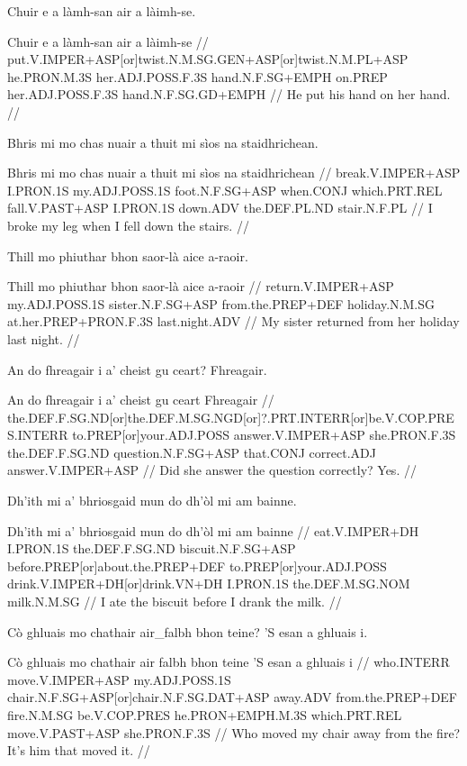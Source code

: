 \documentclass[a4paper,10pt]{article}
\begin{document}
\ex
\begingl
\glpre Chuir e a làmh-san air a làimh-se. 

\vspace{4mm}
\gla Chuir e a làmh-san air a làimh-se  //
\glb put.V.IMPER+ASP[or]twist.N.M.SG.GEN+ASP[or]twist.N.M.PL+ASP he.PRON.M.3S her.ADJ.POSS.F.3S hand.N.F.SG+EMPH on.PREP her.ADJ.POSS.F.3S hand.N.F.SG.GD+EMPH  //
\glft He put his hand on her hand. //
\endgl
\xe

\ex
\begingl
\glpre Bhris mi mo chas nuair a thuit mi sìos na staidhrichean. 

\vspace{4mm}
\gla Bhris mi mo chas nuair a thuit mi sìos na staidhrichean  //
\glb break.V.IMPER+ASP I.PRON.1S my.ADJ.POSS.1S foot.N.F.SG+ASP when.CONJ which.PRT.REL fall.V.PAST+ASP I.PRON.1S down.ADV the.DEF.PL.ND stair.N.F.PL  //
\glft I broke my leg when I fell down the stairs. //
\endgl
\xe

\ex
\begingl
\glpre Thill mo phiuthar bhon saor-là aice a-raoir. 

\vspace{4mm}
\gla Thill mo phiuthar bhon saor-là aice a-raoir  //
\glb return.V.IMPER+ASP my.ADJ.POSS.1S sister.N.F.SG+ASP from.the.PREP+DEF holiday.N.M.SG at.her.PREP+PRON.F.3S last.night.ADV  //
\glft My sister returned from her holiday last night. //
\endgl
\xe

\ex
\begingl
\glpre An do fhreagair i a' cheist gu ceart? Fhreagair. 

\vspace{4mm}
\gla An do fhreagair i a' cheist gu ceart Fhreagair  //
\glb the.DEF.F.SG.ND[or]the.DEF.M.SG.NGD[or]?.PRT.INTERR[or]be.V.COP.PRES.INTERR to.PREP[or]your.ADJ.POSS answer.V.IMPER+ASP she.PRON.F.3S the.DEF.F.SG.ND question.N.F.SG+ASP that.CONJ correct.ADJ answer.V.IMPER+ASP  //
\glft Did she answer the question correctly? Yes. //
\endgl
\xe

\ex
\begingl
\glpre Dh'ith mi a' bhriosgaid mun do dh'òl mi am bainne. 

\vspace{4mm}
\gla Dh'ith mi a' bhriosgaid mun do dh'òl mi am bainne  //
\glb eat.V.IMPER+DH I.PRON.1S the.DEF.F.SG.ND biscuit.N.F.SG+ASP before.PREP[or]about.the.PREP+DEF to.PREP[or]your.ADJ.POSS drink.V.IMPER+DH[or]drink.VN+DH I.PRON.1S the.DEF.M.SG.NOM milk.N.M.SG  //
\glft I ate the biscuit before I drank the milk. //
\endgl
\xe

\ex
\begingl
\glpre Cò ghluais mo chathair air\_falbh bhon teine? 'S esan a ghluais i. 

\vspace{4mm}
\gla Cò ghluais mo chathair {air falbh} bhon teine 'S esan a ghluais i  //
\glb who.INTERR move.V.IMPER+ASP my.ADJ.POSS.1S chair.N.F.SG+ASP[or]chair.N.F.SG.DAT+ASP away.ADV from.the.PREP+DEF fire.N.M.SG be.V.COP.PRES he.PRON+EMPH.M.3S which.PRT.REL move.V.PAST+ASP she.PRON.F.3S  //
\glft Who moved my chair away from the fire? It's him that moved it. //
\endgl
\xe
\end{document}
